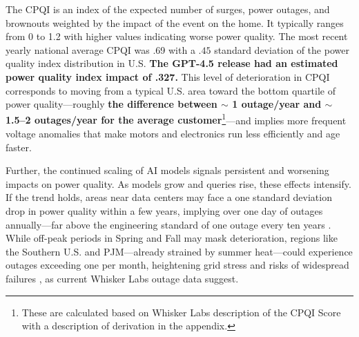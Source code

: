 \documentclass[sigconf,authordraft]{acmart}
\begin{document}
The CPQI is an index of the expected number of surges, power outages, and brownouts weighted by the impact of the event on the home. It typically ranges from 0 to 1.2 with higher values indicating worse power quality. The most recent yearly national average CPQI was .69 with a $.45$ standard deviation of the power quality index distribution in U.S. \textbf{The GPT-4.5 release had an estimated power quality index impact of .327.} This level of deterioration in CPQI corresponds to moving from a typical U.S. area toward the bottom quartile of power quality—roughly \textbf{the difference between $\sim$ 1 outage/year and $\sim$ 1.5–2 outages/year for the average customer}\footnote{These are calculated based on Whisker Labs description of the CPQI Score with a description of derivation in the appendix.}—and implies more frequent voltage anomalies that make motors and electronics run less efficiently and age faster.

Further, the continued scaling of AI models signals persistent and worsening impacts on power quality. As models grow and queries rise, these effects intensify. If the trend holds, areas near data centers may face a one standard deviation drop in power quality within a few years, implying over one day of outages annually—far above the engineering standard of one outage every ten years \cite{NARUC_1in10_standard_ResourceAdequacy}. While off-peak periods in Spring and Fall may mask deterioration, regions like the Southern U.S. and PJM—already strained by summer heat—could experience outages exceeding one per month, heightening grid stress and risks of widespread failures \cite{NERC_2025_Summer_Reliability_Assessment,Thompson2024_AI_Datacenters_Energy_Dynamics}, as current Whisker Labs outage data suggest.
\end{document}

